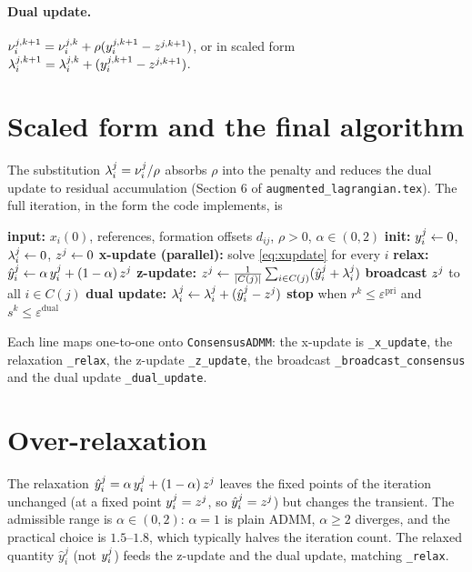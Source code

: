 \documentclass[11pt]{article}
\begin{document}
\paragraph{Dual update.} $\nu_{i}^{j,k+1} = \nu_{i}^{j,k} + \rho(y_{i}^{j,k+1} -
z^{j,k+1})$, or in scaled form
$\lambda_{i}^{j,k+1} = \lambda_{i}^{j,k} + (y_{i}^{j,k+1} - z^{j,k+1})$.

\section{Scaled form and the final algorithm}

The substitution $\lambda_{i}^{j} = \nu_{i}^{j}/\rho$ absorbs $\rho$ into the penalty and
reduces the dual update to residual accumulation (Section 6 of
\texttt{augmented\_lagrangian.tex}). The full iteration, in the form the code implements, is

\begin{algorithm}[h]
\caption{Consensus ADMM for distributed MPC (scaled dual)}
\label{alg:admm}
\begin{algorithmic}[1]
\State \textbf{input:} $x_i(0)$, references, formation offsets $d_{ij}$, $\rho > 0$, $\alpha \in (0,2)$
\State \textbf{init:} $y_{i}^{j} \gets 0$, $\lambda_{i}^{j} \gets 0$, $z^{j} \gets 0$
  \State \textbf{x-update (parallel):} solve \eqref{eq:xupdate} for every $i$
  \State \textbf{relax:} $\hat{y}_i^j \gets \alpha\,y_{i}^{j} + (1-\alpha)\,z^{j}$
  \State \textbf{z-update:} $z^{j} \gets \tfrac{1}{|C(j)|}\sum_{i\in C(j)}(\hat{y}_i^j + \lambda_{i}^{j})$
  \State \textbf{broadcast} $z^{j}$ to all $i \in C(j)$
  \State \textbf{dual update:} $\lambda_{i}^{j} \gets \lambda_{i}^{j} + (\hat{y}_i^j - z^{j})$
  \State \textbf{stop} when $r^k \le \varepsilon^{\mathrm{pri}}$ and $s^k \le \varepsilon^{\mathrm{dual}}$
\EndFor
\end{algorithmic}
\end{algorithm}

Each line maps one-to-one onto \texttt{ConsensusADMM}: the x-update is \verb|_x_update|,
the relaxation \verb|_relax|, the z-update \verb|_z_update|, the broadcast
\verb|_broadcast_consensus| and the dual update \verb|_dual_update|.

\section{Over-relaxation}

The relaxation $\hat{y}_i^j = \alpha\,y_{i}^{j} + (1-\alpha)\,z^{j}$ leaves the fixed
points of the iteration unchanged (at a fixed point $y_{i}^{j} = z^{j}$, so
$\hat{y}_i^j = z^{j}$) but changes the transient. The admissible range is
$\alpha \in (0, 2)$: $\alpha = 1$ is plain ADMM, $\alpha \ge 2$ diverges, and the practical
choice is $1.5$--$1.8$, which typically halves the iteration count. The relaxed quantity
$\hat{y}_i^j$ (not $y_{i}^{j}$) feeds the z-update and the dual update, matching
\verb|_relax|.
\end{document}
